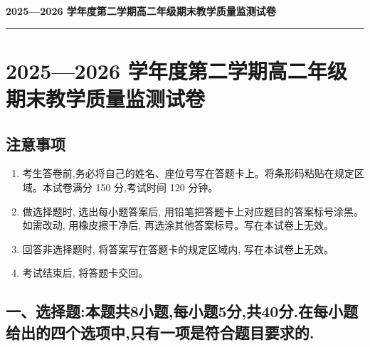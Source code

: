 \documentclass[UTF8,12pt,a4paper]{ctexart}
\renewcommand{\labelenumi}{\arabic{enumi}.}
\begin{document}
\color{SolutionInk}

\begin{center}
  {\LARGE\bfseries\color{SolutionBlue}2025---2026 学年度第二学期高二年级期末教学质量监测试卷\par}
  \vspace{0.35em}
  {\color{SolutionTeal}\rule{0.32\textwidth}{1.4pt}}
\end{center}
\vspace{0.85em}


\section{2025---2026 学年度第二学期高二年级期末教学质量监测试卷}\label{ux5b66ux5e74ux5ea6ux7b2cux4e8cux5b66ux671fux9ad8ux4e8cux5e74ux7ea7ux671fux672bux6559ux5b66ux8d28ux91cfux76d1ux6d4bux8bd5ux5377}

\subsection{注意事项}\label{ux6ce8ux610fux4e8bux9879}

\begin{enumerate}
\def\labelenumi{\arabic{enumi}.}
\item
  考生答卷前,务必将自己的姓名、座位号写在答题卡上。将条形码粘贴在规定区域。本试卷满分 150 分,考试时间 120 分钟。
\item
  做选择题时, 选出每小题答案后, 用铅笔把答题卡上对应题目的答案标号涂黑。如需改动, 用橡皮擦干净后, 再选涂其他答案标号。写在本试卷上无效。
\item
  回答非选择题时, 将答案写在答题卡的规定区域内, 写在本试卷上无效。
\item
  考试结束后, 将答题卡交回。
\end{enumerate}

\subsection{一、选择题:本题共8小题,每小题5分,共40分.在每小题给出的四个选项中,只有一项是符合题目要求的.}\label{ux4e00ux9009ux62e9ux9898ux672cux9898ux51718ux5c0fux9898ux6bcfux5c0fux98985ux5206ux517140ux5206.ux5728ux6bcfux5c0fux9898ux7ed9ux51faux7684ux56dbux4e2aux9009ux9879ux4e2dux53eaux6709ux4e00ux9879ux662fux7b26ux5408ux9898ux76eeux8981ux6c42ux7684.}
\end{document}
